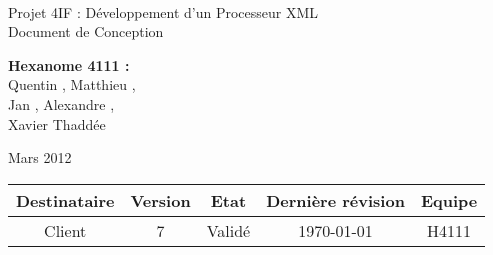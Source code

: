 \documentclass[a4paper]{article}
\begin{document}
\begin{titlepage}
~ 
\vfill
	\begin{center}
		\begin{Huge}
		Projet 4IF : Développement d'un Processeur XML\\ %
		Document de Conception\\
		\end{Huge} 
\vfill
		\textbf{Hexanome 4111 :} 
		\\Quentin {}, Matthieu , 
		\\Jan {}, Alexandre , 
		\\Xavier {}Thaddée 
\vfill		
		\begin{Large}
		Mars 2012
		\end{Large}
\vfill
	\begin{tabular}{|c|c|c|c|c|}
 	 \hline
   Destinataire & Version & Etat & Dernière révision & Equipe \\
   \hline
   Client & 7 & Validé & \today & H4111 \\
   \hline
	\end{tabular}
	\end{center}
\vfill
\end{titlepage}
\newpage
\tableofcontents
\newpage


\end{document}
